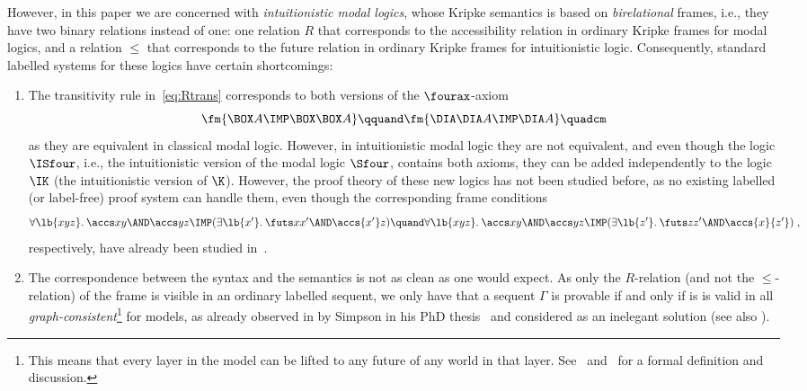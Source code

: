 However,
in this paper we are concerned with \emph{intuitionistic modal
  logics}, whose Kripke semantics is based on \emph{birelational}
frames, i.e., they have two binary relations instead of one: one
relation $R$ that corresponds to the accessibility relation in
ordinary Kripke frames for modal logics, and a relation $\le$ that
corresponds to the future relation in ordinary Kripke frames for
intuitionistic logic. Consequently, standard labelled systems for
these logics have certain shortcomings:
\begin{enumerate}
\item The transitivity rule in~\eqref{eq:Rtrans} corresponds to both
  versions of the $\fourax$-axiom
  \begin{equation}
    \label{eq:4ax}
    \fm{\BOX A\IMP \BOX\BOX A}
    \qquand
    \fm{\DIA\DIA A\IMP\DIA A}
    \quadcm
  \end{equation}
  as they are equivalent in classical
  modal logic. However, in intuitionistic modal logic they are not
  equivalent, and even though the logic $\ISfour$, i.e., the
  intuitionistic version of the modal logic $\Sfour$, contains both
  axioms, they can be added independently to the logic $\IK$ (the
  intuitionistic version of $\K$). However, the proof theory of these
  new logics has not been studied before, as no existing labelled (or
  label-free) proof system can handle them, even though the
  corresponding frame conditions
  \begin{equation}
    \label{eq:4frame}
    \forall\lb{xyz}.\:\accs xy\AND \accs yz\IMP(\exists\lb{x'}.\:\futs x{x'}\AND\accs {x'}z)
    \quand
    \forall\lb{xyz}.\:\accs xy\AND \accs yz\IMP(\exists\lb{z'}.\:\futs z{z'}\AND\accs {x}{z'})
    \;,
  \end{equation}
  respectively, have already been studied
  in~\cite{plotkin:stirling:86}.
  \item The correspondence between the syntax and the semantics is not
  as clean as one would expect. As only the $R$-relation (and not the
  $\le$-relation) of the frame is visible in an ordinary labelled
  sequent, we only have that a sequent $\Gamma$ is provable if and
  only if is is valid in all \emph{graph-consistent}\footnote{This
    means that every layer in the model can be lifted to any future of
    any world in that layer. See~\cite{simpson:phd} and~\cite{mar:str:tableaux17} for a formal definition and discussion.} for  models, as
  already observed in by Simpson in his PhD thesis~\cite{simpson:phd}
  and considered as an inelegant solution (see also \cite{mar:str:tableaux17}).
\end{enumerate}
